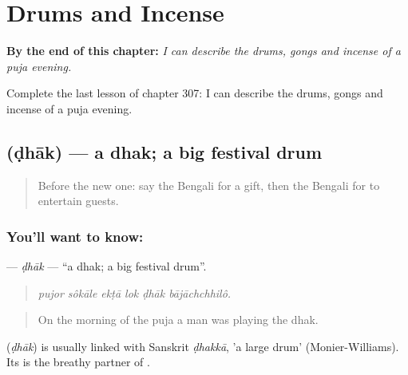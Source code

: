 
\chapter{Drums and Incense}
\label{ch:bn-drums-and-incense}

\begin{chapteropening}
\textbf{By the end of this chapter:} \emph{I can describe the drums, gongs and incense of a puja evening.}

Complete the last lesson of chapter 307: I can describe the drums, gongs and incense of a puja evening.
\end{chapteropening}

\section[\texorpdfstring{\bn{ঢাক} (ḍhāk)}{ঢাক (ḍhāk)}]{ (ḍhāk) — a dhak; a big festival drum}

\label{lesson:BN-C307-dhak}



\begin{quote}
Before the new one: say the Bengali for a gift, then the Bengali for to entertain guests.
\end{quote}

\subsection*{You'll want to know: }
\textbf{} — \emph{ḍhāk} — \textquotedblleft{}a dhak; a big festival drum\textquotedblright{}.

\begin{quote}
     
\end{quote}

\begin{quote}
\emph{pujor sôkāle ekṭā lok ḍhāk bājāchchhilô.}
\end{quote}

\begin{quote}
On the morning of the puja a man was playing the dhak.
\end{quote}

\begin{cousinweb}
\textbf{} (\emph{ḍhāk}) is usually linked with Sanskrit \emph{ḍhakkā}, 'a large drum' (Monier-Williams). Its  is the breathy partner of .
\end{cousinweb}

